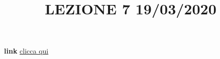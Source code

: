 \title{LEZIONE 7 19/03/2020}\newline
\textbf{link} \href{https://web.microsoftstream.com/video/2feefb06-11cb-4de4-ac19-dcc5fe175a98?list=user&userId=faa91214-a6f5-40d7-8875-253fd49b8ce1}{clicca qui}
\subsection{}